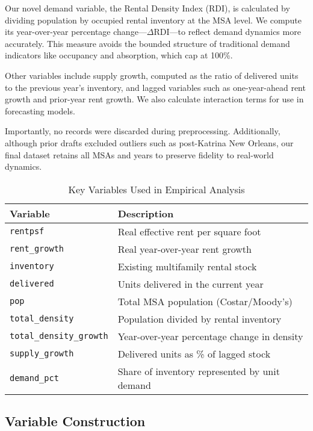 \documentclass[sn-mathphys-num]{sn-jnl}%
\theoremstyle{thmstyleone}%
\theoremstyle{thmstyletwo}%
\theoremstyle{thmstylethree}%
\begin{document}
Our novel demand variable, the Rental Density Index (RDI), is calculated by dividing population by occupied rental inventory at the MSA level. We compute its year-over-year percentage change---\(\Delta\text{RDI}\)---to reflect demand dynamics more accurately. This measure avoids the bounded structure of traditional demand indicators like occupancy and absorption, which cap at 100\%.

Other variables include supply growth, computed as the ratio of delivered units to the previous year's inventory, and lagged variables such as one-year-ahead rent growth and prior-year rent growth. We also calculate interaction terms for use in forecasting models.

Importantly, no records were discarded during preprocessing. Additionally, although prior drafts excluded outliers such as post-Katrina New Orleans, our final dataset retains all MSAs and years to preserve fidelity to real-world dynamics.

\begin{table}[H]
	\centering
	\begin{tabular}{l l}
		\toprule
		\textbf{Variable} & \textbf{Description} \\
		\midrule
		\texttt{rentpsf} & Real effective rent per square foot \\
		\texttt{rent\_growth} & Real year-over-year rent growth \\
		\texttt{inventory} & Existing multifamily rental stock \\
		\texttt{delivered} & Units delivered in the current year \\
		\texttt{pop} & Total MSA population (Costar/Moody's) \\
		\texttt{total\_density} & Population divided by rental inventory \\
		\texttt{total\_density\_growth} & Year-over-year percentage change in density \\
		\texttt{supply\_growth} & Delivered units as \% of lagged stock \\
		\texttt{demand\_pct} & Share of inventory represented by unit demand \\
		\bottomrule
	\end{tabular}
	\caption{Key Variables Used in Empirical Analysis}
	\label{tab:variables}
\end{table}

\subsection{Variable Construction}
\end{document}
